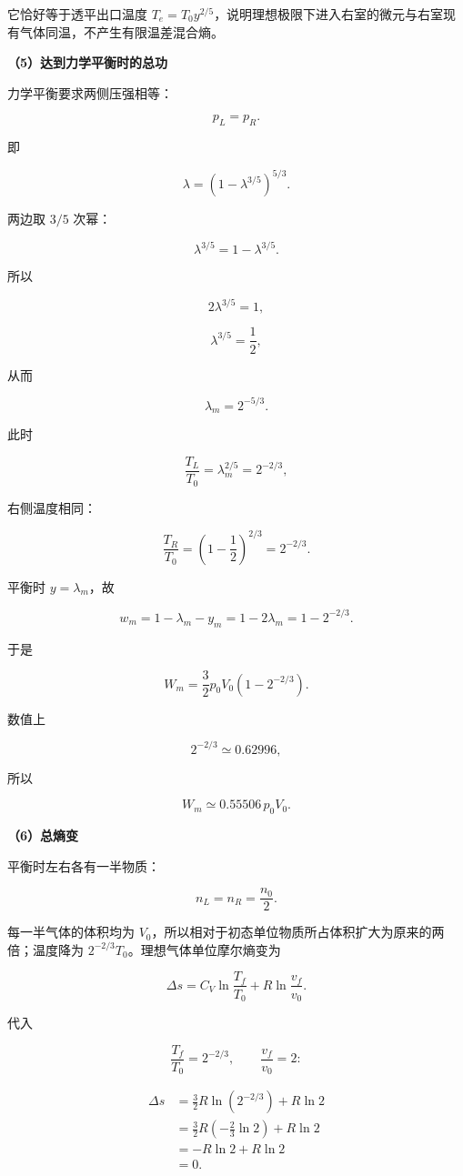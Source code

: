 \documentclass[12pt,a4paper,UTF8]{ctexart}
\begin{document}
它恰好等于透平出口温度
\(T_e=T_0y^{2/5}\)，说明理想极限下进入右室的微元与右室现有气体同温，不产生有限温差混合熵。

\textbf{（5）达到力学平衡时的总功}

力学平衡要求两侧压强相等：

\[p_L=p_R.\]

即

\[
\lambda=\left(1-\lambda^{3/5}\right)^{5/3}.
\]

两边取 \(3/5\) 次幂：

\[
\lambda^{3/5}=1-\lambda^{3/5}.
\]

所以

\[
2\lambda^{3/5}=1,
\]

\[
\lambda^{3/5}=\frac12,
\]

从而

\[
\boxed{\lambda_m=2^{-5/3}}.
\]

此时

\[
\frac{T_L}{T_0}=\lambda_m^{2/5}
=2^{-2/3},
\]

右侧温度相同：

\[
\frac{T_R}{T_0}
=\left(1-\frac12\right)^{2/3}
=2^{-2/3}.
\]

平衡时 \(y=\lambda_m\)，故

\[
w_m=1-\lambda_m-y_m
=1-2\lambda_m
=1-2^{-2/3}.
\]

于是

\[
\boxed{
W_m=\frac32p_0V_0
\left(1-2^{-2/3}\right)
}.
\]

数值上

\[
2^{-2/3}\simeq0.62996,
\]

所以

\[W_m\simeq0.55506\,p_0V_0.\]

\textbf{（6）总熵变}

平衡时左右各有一半物质：

\[n_L=n_R=\frac{n_0}{2}.\]

每一半气体的体积均为
\(V_0\)，所以相对于初态单位物质所占体积扩大为原来的两倍；温度降为
\(2^{-2/3}T_0\)。理想气体单位摩尔熵变为

\[
\Delta s=C_V\ln\frac{T_f}{T_0}
+R\ln\frac{v_f}{v_0}.
\]

代入

\[
\frac{T_f}{T_0}=2^{-2/3},
\qquad
\frac{v_f}{v_0}=2:
\]

\[
\begin{aligned}
\Delta s
&=\frac32R\ln(2^{-2/3})+R\ln2\\
&=\frac32R\left(-\frac23\ln2\right)+R\ln2\\
&=-R\ln2+R\ln2\\
&=0.
\end{aligned}
\]
\end{document}
